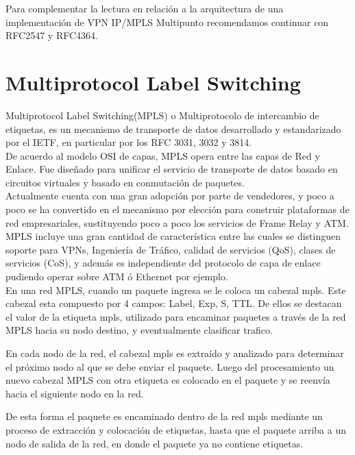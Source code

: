 Para complementar la lectura en relaci\'on a la arquitectura de una implementaci\'on de VPN IP/MPLS Multipunto recomendamos continuar con RFC2547\citep{rosen1999bgp} y RFC4364\citep{rosen2006bgp}.

\section{Multiprotocol Label Switching}
\label{section2.8}

Multiprotocol Label Switching(MPLS) o Multiprotocolo de intercambio de etiquetas, es un mecanismo de transporte de datos desarrollado y estandarizado por el IETF, en particular por los RFC 3031\cite{rosen2001multiprotocol}, 3032\citep{rosen2001mpls} y 3814\citep{nadeau2004multiprotocol}.\\

De acuerdo al modelo OSI de capas, MPLS opera entre las capas de Red y Enlace. Fue diseñado para unificar el servicio de transporte de datos basado en circuitos virtuales y basado en conmutación de paquetes.\\

Actualmente cuenta con una gran adopción por parte de vendedores, y poco a poco se ha convertido en el mecanismo por elección para construir plataformas de red empresariales, sustituyendo poco a poco los servicios de Frame Relay y ATM.\\
 
MPLS incluye una gran cantidad de característica entre las cuales se distinguen soporte para VPNs, Ingeniería de Tráfico, calidad de servicios (QoS), clases de servicios (CoS), y además es independiente del protocolo de capa de enlace pudiendo operar sobre ATM ó Ethernet por ejemplo.\\

En una red MPLS, cuando un paquete ingresa se le coloca un cabezal mpls. Este cabezal esta compuesto por 4 campos: Label, Exp, S, TTL. De ellos se destacan el valor de la etiqueta mpls, utilizado para encaminar paquetes a través de la red MPLS hacia su nodo destino, y eventualmente clasificar trafico.

En cada nodo de la red, el cabezal mpls es extraído y analizado para determinar el próximo nodo al que se debe enviar el paquete. Luego del procesamiento un nuevo cabezal MPLS con otra etiqueta es colocado en el paquete y se reenvía hacia el siguiente nodo en la red.

De esta forma el paquete es encaminado dentro de la red mpls mediante un proceso de extracción y colocación de etiquetas, hasta que el paquete arriba a un nodo de salida de la red, en donde el paquete ya no contiene etiquetas.\\

